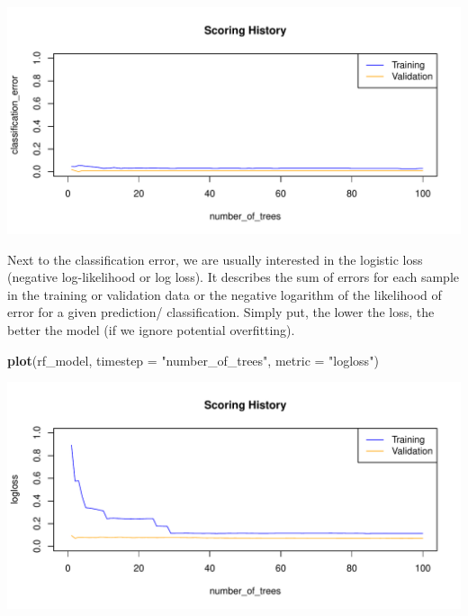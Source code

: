 \documentclass[]{article}
\newenvironment{Shaded}{\begin{snugshade}}{\end{snugshade}}
\newcommand{\KeywordTok}[1]{\textcolor[rgb]{0.13,0.29,0.53}{\textbf{{#1}}}}
\newcommand{\DataTypeTok}[1]{\textcolor[rgb]{0.13,0.29,0.53}{{#1}}}
\newcommand{\StringTok}[1]{\textcolor[rgb]{0.31,0.60,0.02}{{#1}}}
\newcommand{\NormalTok}[1]{{#1}}
\begin{document}
\begin{center}\includegraphics{webinar_code_files/figure-latex/unnamed-chunk-36-1} \end{center}

Next to the classification error, we are usually interested in the
logistic loss (negative log-likelihood or log loss). It describes the
sum of errors for each sample in the training or validation data or the
negative logarithm of the likelihood of error for a given prediction/
classification. Simply put, the lower the loss, the better the model (if
we ignore potential overfitting).

\begin{Shaded}
\begin{Highlighting}[]
\KeywordTok{plot}\NormalTok{(rf_model,}
     \DataTypeTok{timestep =} \StringTok{"number_of_trees"}\NormalTok{,}
     \DataTypeTok{metric =} \StringTok{"logloss"}\NormalTok{)}
\end{Highlighting}
\end{Shaded}

\begin{center}\includegraphics{webinar_code_files/figure-latex/unnamed-chunk-37-1} \end{center}
\end{document}
